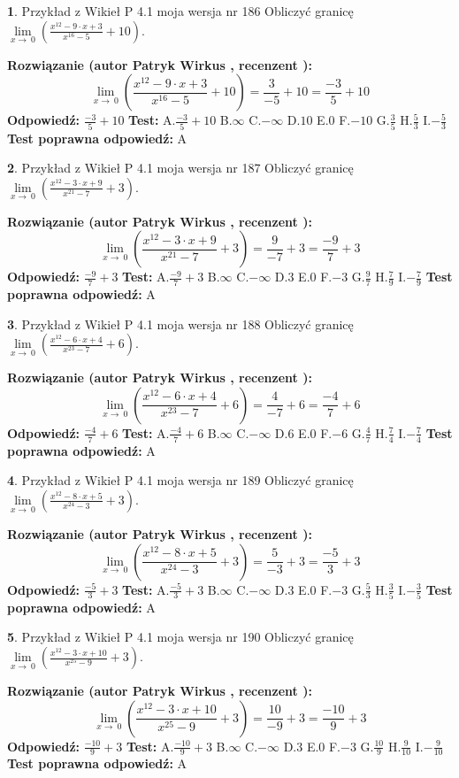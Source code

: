 \documentclass[12pt, a4paper]{article}
\theoremstyle{definition} %
\newtheorem{zad}{}
\newcommand{\zadStart}[1]{\begin{zad}#1\newline}
\newcommand{\zadStop}{\end{zad}}
\newcommand{\rozwStart}[2]{\noindent \textbf{Rozwiązanie (autor #1 , recenzent #2): }\newline}
\newcommand{\rozwStop}{\newline}
\newcommand{\odpStart}{\noindent \textbf{Odpowiedź:}\newline}
\newcommand{\odpStop}{\newline}
\newcommand{\testStart}{\noindent \textbf{Test:}\newline}
\newcommand{\testStop}{\newline}
\newcommand{\kluczStart}{\noindent \textbf{Test poprawna odpowiedź:}\newline}
\newcommand{\kluczStop}{\newline}
\begin{document}
\zadStart{Przykład z Wikieł P 4.1 moja wersja nr 186}
Obliczyć granicę $\lim\limits_{x\to\ 0}(\frac{x^{12}-9 \cdot x +3}{x^{16}-5}+10)$.
\zadStop
\rozwStart{Patryk Wirkus}{}
$$\lim\limits_{x\to\ 0}(\frac{x^{12}-9 \cdot x +3}{x^{16}-5}+10)=\frac{3}{-5}+10=\frac{-3}{5}+10$$
\rozwStop
\odpStart
$\frac{-3}{5}+10$
\odpStop
\testStart
A.$\frac{-3}{5}+10$
B.$\infty$
C.$-\infty$
D.$10$
E.$0$
F.$-10$
G.$\frac{3}{5}$
H.$\frac{5}{3}$
I.$-\frac{5}{3}$
\testStop
\kluczStart
A
\kluczStop



\zadStart{Przykład z Wikieł P 4.1 moja wersja nr 187}
Obliczyć granicę $\lim\limits_{x\to\ 0}(\frac{x^{12}-3 \cdot x +9}{x^{21}-7}+3)$.
\zadStop
\rozwStart{Patryk Wirkus}{}
$$\lim\limits_{x\to\ 0}(\frac{x^{12}-3 \cdot x +9}{x^{21}-7}+3)=\frac{9}{-7}+3=\frac{-9}{7}+3$$
\rozwStop
\odpStart
$\frac{-9}{7}+3$
\odpStop
\testStart
A.$\frac{-9}{7}+3$
B.$\infty$
C.$-\infty$
D.$3$
E.$0$
F.$-3$
G.$\frac{9}{7}$
H.$\frac{7}{9}$
I.$-\frac{7}{9}$
\testStop
\kluczStart
A
\kluczStop



\zadStart{Przykład z Wikieł P 4.1 moja wersja nr 188}
Obliczyć granicę $\lim\limits_{x\to\ 0}(\frac{x^{12}-6 \cdot x +4}{x^{23}-7}+6)$.
\zadStop
\rozwStart{Patryk Wirkus}{}
$$\lim\limits_{x\to\ 0}(\frac{x^{12}-6 \cdot x +4}{x^{23}-7}+6)=\frac{4}{-7}+6=\frac{-4}{7}+6$$
\rozwStop
\odpStart
$\frac{-4}{7}+6$
\odpStop
\testStart
A.$\frac{-4}{7}+6$
B.$\infty$
C.$-\infty$
D.$6$
E.$0$
F.$-6$
G.$\frac{4}{7}$
H.$\frac{7}{4}$
I.$-\frac{7}{4}$
\testStop
\kluczStart
A
\kluczStop



\zadStart{Przykład z Wikieł P 4.1 moja wersja nr 189}
Obliczyć granicę $\lim\limits_{x\to\ 0}(\frac{x^{12}-8 \cdot x +5}{x^{24}-3}+3)$.
\zadStop
\rozwStart{Patryk Wirkus}{}
$$\lim\limits_{x\to\ 0}(\frac{x^{12}-8 \cdot x +5}{x^{24}-3}+3)=\frac{5}{-3}+3=\frac{-5}{3}+3$$
\rozwStop
\odpStart
$\frac{-5}{3}+3$
\odpStop
\testStart
A.$\frac{-5}{3}+3$
B.$\infty$
C.$-\infty$
D.$3$
E.$0$
F.$-3$
G.$\frac{5}{3}$
H.$\frac{3}{5}$
I.$-\frac{3}{5}$
\testStop
\kluczStart
A
\kluczStop



\zadStart{Przykład z Wikieł P 4.1 moja wersja nr 190}
Obliczyć granicę $\lim\limits_{x\to\ 0}(\frac{x^{12}-3 \cdot x +10}{x^{25}-9}+3)$.
\zadStop
\rozwStart{Patryk Wirkus}{}
$$\lim\limits_{x\to\ 0}(\frac{x^{12}-3 \cdot x +10}{x^{25}-9}+3)=\frac{10}{-9}+3=\frac{-10}{9}+3$$
\rozwStop
\odpStart
$\frac{-10}{9}+3$
\odpStop
\testStart
A.$\frac{-10}{9}+3$
B.$\infty$
C.$-\infty$
D.$3$
E.$0$
F.$-3$
G.$\frac{10}{9}$
H.$\frac{9}{10}$
I.$-\frac{9}{10}$
\testStop
\kluczStart
A
\kluczStop
\end{document}
